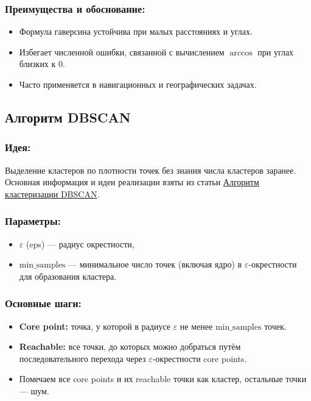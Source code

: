 \documentclass[a4paper,14pt]{extarticle}
\begin{document}
\begin{itemize}
    \subsubsection*{Преимущества и обоснование:}
    \begin{itemize}
        \item Формула гаверсина устойчива при малых расстояниях и углах.
        \item Избегает численной ошибки, связанной с вычислением $\arccos$ при углах близких к 0.
        \item Часто применяется в навигационных и географических задачах.
    \end{itemize}


    \subsection*{Алгоритм DBSCAN}

    \subsubsection*{Идея:}
    Выделение кластеров по плотности точек без знания числа кластеров заранее.
    Основная информация и идеи реализации взяты из статьи \href{https://proproprogs.ru/ml/ml-algoritm-klasterizacii-dbscan}{Алгоритм кластеризации DBSCAN}.

    \subsubsection*{Параметры:}
    \begin{itemize}
        \item $\varepsilon$ (eps) — радиус окрестности,
        \item $\text{min\_samples}$ — минимальное число точек (включая ядро) в $\varepsilon$-окрестности для образования кластера.
    \end{itemize}

    \subsubsection*{Основные шаги:}
    \begin{itemize}
        \item \textbf{Core point:} точка, у которой в радиусе $\varepsilon$ не менее $\text{min\_samples}$ точек.
        \item \textbf{Reachable:} все точки, до которых можно добраться путём последовательного перехода через $\varepsilon$-окрестности core points.
        \item Помечаем все core points и их reachable точки как кластер, остальные точки — шум.
    \end{itemize}


\end{itemize}
\end{document}
